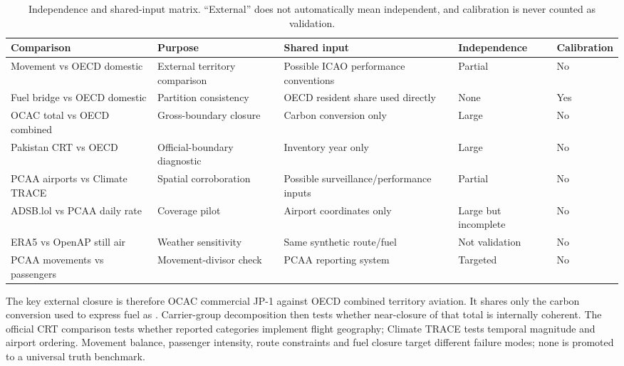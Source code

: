 \begin{table}[htbp]
\centering
\footnotesize
\begin{tabular}{@{}p{}p{}p{}p{}p{}@{}}
\toprule
\textbf{Comparison} & \textbf{Purpose} & \textbf{Shared input} & \textbf{Independence} & \textbf{Calibration} \\
\midrule
Movement vs OECD domestic & External territory comparison & Possible ICAO performance conventions & Partial & No \\
Fuel bridge vs OECD domestic & Partition consistency & OECD resident share used directly & None & Yes \\
OCAC total vs OECD combined & Gross-boundary closure & Carbon conversion only & Large & No \\
Pakistan CRT vs OECD & Official-boundary diagnostic & Inventory year only & Large & No \\
PCAA airports vs Climate TRACE & Spatial corroboration & Possible surveillance/performance inputs & Partial & No \\
ADSB.lol vs PCAA daily rate & Coverage pilot & Airport coordinates only & Large but incomplete & No \\
ERA5 vs OpenAP still air & Weather sensitivity & Same synthetic route/fuel & Not validation & No \\
PCAA movements vs passengers & Movement-divisor check & PCAA reporting system & Targeted & No \\
\bottomrule
\end{tabular}
\caption{Independence and shared-input matrix. ``External'' does not automatically mean
independent, and calibration is never counted as validation.}
\label{tab:independence}
\end{table}

The key external closure is therefore OCAC commercial JP-1 against OECD combined territory
aviation. It shares only the carbon conversion used to express fuel as \COtwo{}. Carrier-group
decomposition then tests whether near-closure of that total is internally coherent. The
official CRT comparison tests whether reported categories implement flight geography; Climate
TRACE tests temporal magnitude and airport ordering. Movement balance, passenger intensity,
route constraints and fuel closure target different failure modes; none is promoted to a
universal truth benchmark.
